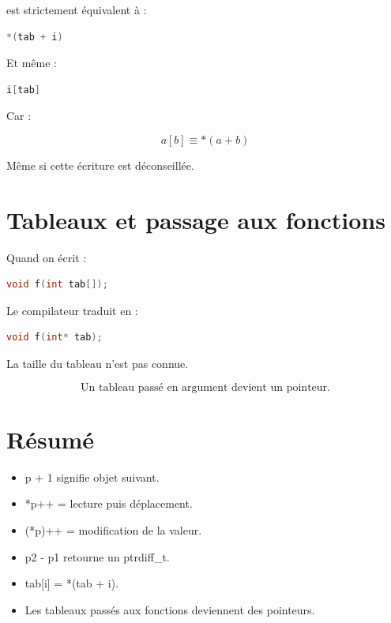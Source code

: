 est strictement équivalent à :

\begin{lstlisting}[language=C]
*(tab + i)
\end{lstlisting}

Et même :

\begin{lstlisting}[language=C]
i[tab]
\end{lstlisting}

Car :

\[
a[b] \equiv *(a + b)
\]

Même si cette écriture est déconseillée.

\section{Tableaux et passage aux fonctions}

Quand on écrit :

\begin{lstlisting}[language=C]
void f(int tab[]);
\end{lstlisting}

Le compilateur traduit en :

\begin{lstlisting}[language=C]
void f(int* tab);
\end{lstlisting}

La taille du tableau n’est pas connue.

\[
\boxed{
\text{Un tableau passé en argument devient un pointeur.}
}
\]

\section{Résumé}

\begin{itemize}
\item p + 1 signifie objet suivant.
\item *p++ = lecture puis déplacement.
\item (*p)++ = modification de la valeur.
\item p2 - p1 retourne un ptrdiff_t.
\item tab[i] = *(tab + i).
\item Les tableaux passés aux fonctions deviennent des pointeurs.
\end{itemize}

